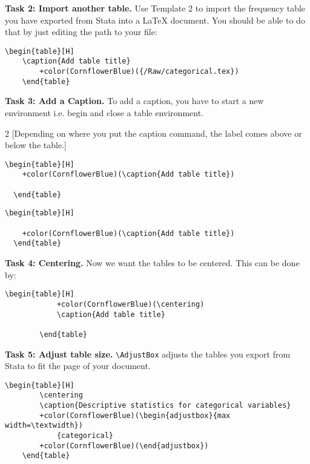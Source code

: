 \documentclass[12pts]{report}
\begin{document}
\textbf{Task 2: Import another table.} Use Template 2 to import the frequency table you have exported from Stata into a {\LaTeX} document. You should be able to do that by just editing the path to your file:
\begin{center}
	\begin{Verbatim}[commandchars=+\(\)]
	\begin{table}[H]
	\caption{Add table title}
		+color(CornflowerBlue)({/Raw/categorical.tex})
	\end{table}
	\end{Verbatim}
\end{center}

\textbf{Task 3: Add a Caption.} To add a caption, you have to start a new environment i.e. begin and close a table environment. 
\begin{multicols}{2}
	[Depending on where you put the caption command, the label comes above or below the table.]
	\begin{Verbatim}[commandchars=+\(\)]
  \begin{table}[H]
  	+color(CornflowerBlue)(\caption{Add table title})
  	
  \end{table}
	\end{Verbatim}

	\begin{Verbatim}[commandchars=+\(\)]
  \begin{table}[H]
  	
  	+color(CornflowerBlue)(\caption{Add table title})
  \end{table}
	\end{Verbatim}
\end{multicols}

\textbf{Task 4: Centering.} Now we want the tables to be centered. This can be done by:

	\begin{Verbatim}[commandchars=+\(\)]
		\begin{table}[H]
			+color(CornflowerBlue)(\centering)
			\caption{Add table title}
			
		\end{table}
	\end{Verbatim}

\textbf{Task 5: Adjust table size.} \verb|\AdjustBox| adjusts the tables you export from Stata to fit the page of your document.
\begin{Verbatim}[commandchars=+\(\)]
	\begin{table}[H]
		\centering
		\caption{Descriptive statistics for categorical variables}
		+color(CornflowerBlue)(\begin{adjustbox}{max width=\textwidth})  
			{categorical}
		+color(CornflowerBlue)(\end{adjustbox})
	\end{table}
\end{Verbatim}
\end{document}
